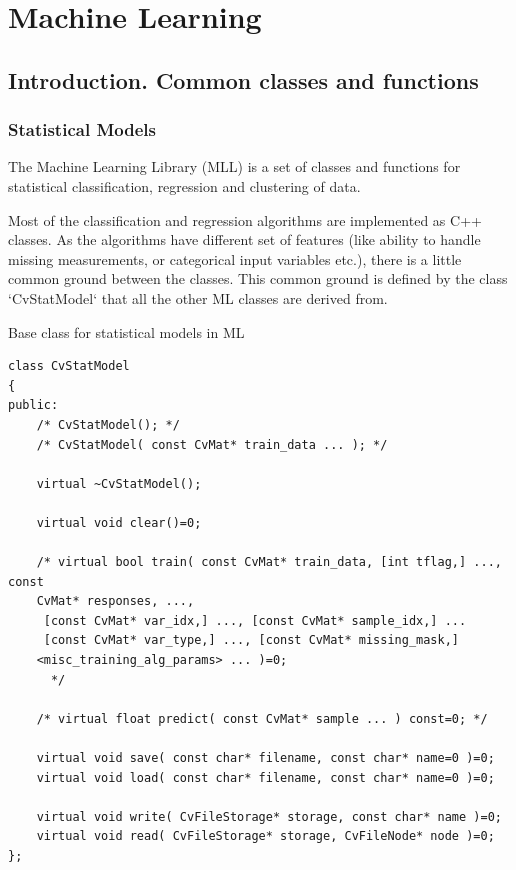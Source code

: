 \chapter{Machine Learning}

\section{Introduction. Common classes and functions}

\subsection{Statistical Models}

The Machine Learning Library (MLL) is a set of classes and functions for statistical classification, regression and clustering of data.

Most of the classification and regression algorithms are implemented as C++ classes. As the algorithms have different set of features (like ability to handle missing measurements, or categorical input variables etc.), there is a little common ground between the classes. This common ground is defined by the class `CvStatModel` that all the other ML classes are derived from.



Base class for statistical models in ML

\begin{lstlisting}
class CvStatModel
{
public:
    /* CvStatModel(); */
    /* CvStatModel( const CvMat* train_data ... ); */

    virtual ~CvStatModel();

    virtual void clear()=0;

    /* virtual bool train( const CvMat* train_data, [int tflag,] ..., const 
	CvMat* responses, ...,
     [const CvMat* var_idx,] ..., [const CvMat* sample_idx,] ...
     [const CvMat* var_type,] ..., [const CvMat* missing_mask,] 
	<misc_training_alg_params> ... )=0;
      */

    /* virtual float predict( const CvMat* sample ... ) const=0; */

    virtual void save( const char* filename, const char* name=0 )=0;
    virtual void load( const char* filename, const char* name=0 )=0;

    virtual void write( CvFileStorage* storage, const char* name )=0;
    virtual void read( CvFileStorage* storage, CvFileNode* node )=0;
};
\end{lstlisting}

